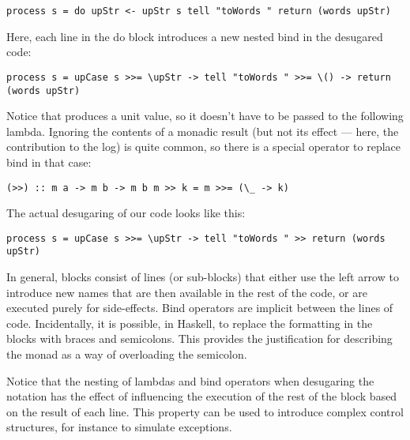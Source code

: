 \begin{verbatim}
process s = do upStr <- upStr s tell "toWords " return (words upStr)
\end{verbatim}

Here, each line in the do block introduces a new nested bind in the
desugared code:

\begin{verbatim}
process s = upCase s >>= \upStr -> tell "toWords " >>= \() -> return (words upStr)
\end{verbatim}

Notice that  produces a unit value, so it doesn't have to
be passed to the following lambda. Ignoring the contents of a monadic
result (but not its effect --- here, the contribution to the log) is
quite common, so there is a special operator to replace bind in that
case:

\begin{verbatim}
(>>) :: m a -> m b -> m b m >> k = m >>= (\_ -> k)
\end{verbatim}

The actual desugaring of our code looks like this:

\begin{verbatim}
process s = upCase s >>= \upStr -> tell "toWords " >> return (words upStr)
\end{verbatim}

In general,  blocks consist of lines (or sub-blocks) that
either use the left arrow to introduce new names that are then available
in the rest of the code, or are executed purely for side-effects. Bind
operators are implicit between the lines of code. Incidentally, it is
possible, in Haskell, to replace the formatting in the 
blocks with braces and semicolons. This provides the justification for
describing the monad as a way of overloading the semicolon.

Notice that the nesting of lambdas and bind operators when desugaring
the  notation has the effect of influencing the execution of
the rest of the  block based on the result of each line. This
property can be used to introduce complex control structures, for
instance to simulate exceptions.

